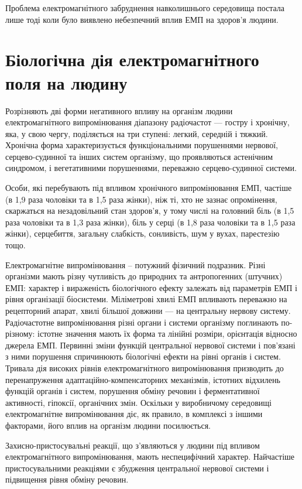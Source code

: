 \documentclass[14pt]{extarticle} %
\begin{document}
Проблема електромагнітного забруднення навколишнього середовища постала лише
тоді коли було виявлено небезпечний вплив ЕМП на здоров'я людини.
\section{Біологічна дія електромагнітного поля на людину}
Розрізняють дві форми негативного впливу на організм людини електромагнітного
випромінювання діапазону радіочастот — гостру і хронічну, яка, у свою чергу,
поділяється на три ступені: легкий, середній і тяжкий. Хронічна форма
характеризується функціональними порушеннями нервової, серцево-судинної та
інших систем організму, що проявляються астенічним синдромом, і вегетативними
порушеннями, переважно серцево-судинної системи.

Особи, які перебувають під впливом хронічного випромінювання ЕМП, частіше (в
1,9 раза чоловіки та в 1,5 раза жінки), ніж ті, хто не зазнає опромінення,
скаржаться на незадовільний стан здоров'я, у тому числі на головний біль (в 1,5
раза чоловіки та в 1,3 раза жінки), біль у серці (в 1,8 раза чоловіки та в 1,5
раза жінки), серцебиття, загальну слабкість, сонливість, шум у вухах,
парестезію тощо.

Електромагнітне випромінювання -- потужний фізичний подразник. Різні організми
мають різну чутливість до природних та антропогенних (штучних) ЕМП: характер і
вираженість біологічного ефекту залежать від параметрів ЕМП і рівня організації
біосистеми. Міліметрові хвилі ЕМП впливають переважно на рецепторний апарат,
хвилі більшої довжини — на центральну нервову систему.
Радіочастотне випромінювання різні органи і системи організму поглинають
по-різному: істотне значення мають їх форма та лінійні розміри, орієнтація
відносно джерела ЕМП. Первинні зміни функцій центральної нервової системи і
пов'язані з ними порушення спричинюють біологічні ефекти на рівні органів і
систем. Тривала дія високих рівнів електромагнітного випромінювання призводить
до перенапруження адаптаційно-компенсаторних механізмів, істотних відхилень
функцій органів і систем, порушення обміну речовин і ферментативної активності,
гіпоксії, органічних змін. Оскільки у виробничому середовищі електромагнітне
випромінювання діє, як правило, в комплексі з іншими факторами, його вплив на
організм людини посилюється.

Захисно-пристосувальні реакції, що з'являються у людини під впливом
електромагнітного випромінювання, мають неспецифічний характер. Найчастіше
пристосувальними реакціями є збудження центральної нервової системи і
підвищення рівня обміну речовин.
\end{document}
